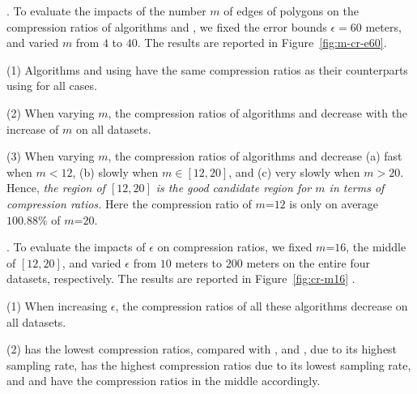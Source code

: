 .
To evaluate the impacts of   the number $m$ of edges of polygons on the compression ratios of algorithms \cist and \cista, we fixed the error bounds {$\epsilon =60$ meters}, and varied $m$ from $4$ to $40$. The results are reported in Figure~\ref{fig:m-cr-e60}.

\ni(1) Algorithms \cist and \cista using \rpia have the same compression ratios as their counterparts using \cpia for all cases.

\ni(2) When varying $m$, the compression ratios of algorithms \cist and \cista decrease with the increase of $m$ on all datasets.

\ni(3) When varying $m$, the compression ratios of algorithms \cist and \cista decrease (a) fast when $m < 12$, (b) slowly when $m \in [12, 20]$, and (c) very slowly when $m > 20$. Hence, \emph{the region of $[12, 20]$ is the good candidate region for $m$ in terms of compression ratios.}
Here the compression ratio of $m$=$12$ is only on average {$100.88\%$} of $m$=$20$.



.
To evaluate the impacts of $\epsilon$ on compression ratios, we fixed {$m$=$16$}, the middle of $[12, 20]$, and varied $\epsilon$ from $10$ meters to $200$ meters on the entire four datasets, respectively.
The results are reported in Figure~\ref{fig:cr-m16} .


\ni (1) When increasing $\epsilon$, the compression ratios of all these algorithms decrease on all datasets.

\ni (2) \pricar has the lowest compression ratios, compared with \truck, \sercar and \geolife, due to its highest sampling rate,
\truck has the highest compression ratios due to its lowest sampling rate, and \sercar and \geolife have the compression ratios in the middle accordingly.

